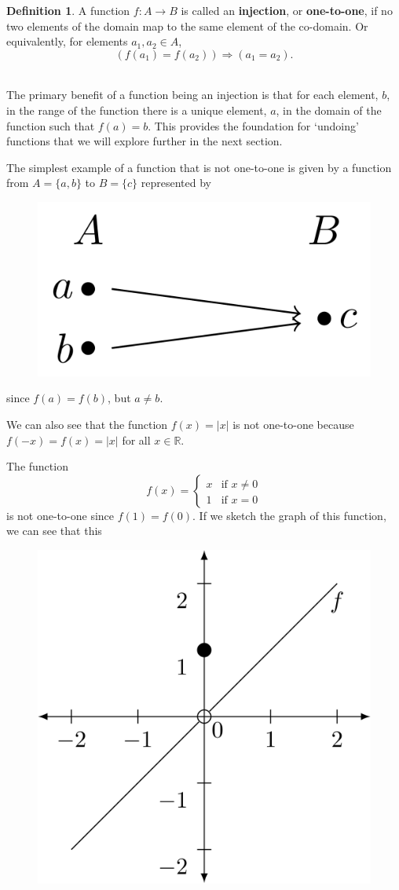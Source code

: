 \documentclass[
]{book}
\theoremstyle{definition}
\newtheorem{definition}{Definition}[chapter]
\theoremstyle{definition}
\theoremstyle{definition}
\theoremstyle{remark}
\begin{document}
\begin{definition}
\protect\hypertarget{def:unnamed-chunk-132}{}{\label{def:unnamed-chunk-132} }A function \(f:A\rightarrow B\) is called an \textbf{injection}, or \textbf{one-to-one}, if no two elements of the domain map to the same element of the co-domain. Or equivalently, for elements \(a_1,a_2 \in A\), \[\left(f(a_1)=f(a_2)\right) \Rightarrow \left(a_1=a_2\right).\]\\
\end{definition}

The primary benefit of a function being an injection is that for each element, \(b\), in the range of the function there is a unique element, \(a\), in the domain of the function such that \(f(a)=b\). This provides the foundation for `undoing' functions that we will explore further in the next section.

The simplest example of a function that is not one-to-one is given by a function from \(A=\{a,b\}\) to \(B=\{c\}\) represented by

\begin{figure}
 
 {\centering \includegraphics[width=0.3\linewidth]{tikz/example-noninjection} 
 
 }
 
 \end{figure}

since \(f(a)=f(b)\), but \(a\neq b\).

We can also see that the function \(f(x)=|x|\) is not one-to-one because \(f(-x)=f(x)=|x|\) for all \(x\in \mathbb{R}\).

The function
\[f(x)=\begin{cases} x & \mbox{if } x\neq 0 \\
1 & \mbox{if } x=0
\end{cases}\]
is not one-to-one since \(f(1)=f(0)\). If we sketch the graph of this function, we can see that this

\begin{figure}
 
 {\centering \includegraphics[width=0.3\linewidth]{tikz/example2-noninjection} 
 
 }
 
 \end{figure}
\end{document}
